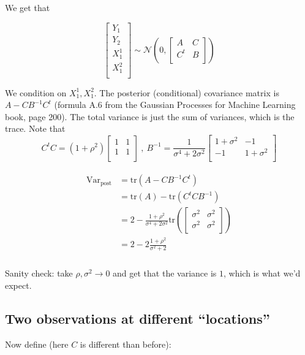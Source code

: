 \documentclass[paper=a4, fontsize=11pt]{scrartcl} %
\numberwithin{equation}{section} %
\numberwithin{figure}{section} %
\numberwithin{table}{section} %
\newcommand{\sig}{\sigma^2}
\newcommand{\nn}{\mathcal{N}}
\newcommand{\var}{\text{Var}}
\newcommand{\post}{\text{post}} %
\newcommand{\tr}{\text{tr}}
\newcommand{\fac}{\frac{1}{ \sigma^4 + 2\sig} }
\begin{document}
We get that 

\[
\begin{bmatrix}
 Y_1    \\
  Y_2   \\
  X_1^1 \\
  X_1^2 \\
\end{bmatrix}
\sim \nn \left ( 0 , 
\begin{bmatrix}   
A      &   C       \\
C^t    &   B    \\ 
\end{bmatrix}
\right )
\]

We condition on $X_1^1 , X_1^2$. The posterior (conditional) covariance matrix is $A - CB^{-1}C^t$ 
(formula A.6 from the Gaussian Processes for Machine Learning book, page 200). The 
total variance is just the sum of variances, which is the trace. Note that
\[
C^tC = (1 +\rho^2)
\begin{bmatrix}   
 1    &   1  \\
 1    &   1  \\ 
\end{bmatrix} 
\ , \
B^{-1}
= \fac
\begin{bmatrix}   
 1+\sig &   -1        \\
 -1      &   1+\sig   \\
\end{bmatrix}
\]

\begin{align}
 \begin{split}
\var_{\post} &= \tr( A - CB^{-1}C^t)  \\
  &= \tr(A) - \tr(C^tCB^{-1}) \\
  &= 2- \frac{1+\rho^2}{\sigma^4 + 2\sig}\tr \left (
\begin{bmatrix}   
 \sig    &   \sig  \\
 \sig    &   \sig  \\ 
\end{bmatrix} 
\right )\\
%
&= 2 - 2\frac{1+\rho^2}{\sig + 2}\\
 \end{split}
\end{align}

Sanity check: take $\rho ,\sig \to 0$ and get that the variance is $1$, which is what we'd expect.





\subsection{Two observations at different ``locations''}
Now define (here $C$ is different than before):
\end{document}
